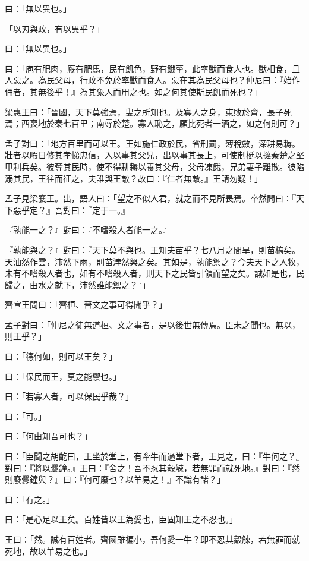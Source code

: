 \documentclass[12pt,a4paper]{ctexbook}
\begin{document}
曰：「無以異也。」\par
「以刃與政，有以異乎？」\par
曰：「無以異也。」\par
曰：「庖有肥肉，廐有肥馬，民有飢色，野有餓莩，此率獸而食人也。獸相食，且人惡之。為民父母，行政不免於率獸而食人。惡在其為民父母也？仲尼曰：『始作俑者，其無後乎！』為其象人而用之也。如之何其使斯民飢而死也？」\par
梁惠王曰：「晉國，天下莫強焉，叟之所知也。及寡人之身，東敗於齊，長子死焉；西喪地於秦七百里；南辱於楚。寡人恥之，願比死者一洒之，如之何則可？」\par
孟子對曰：「地方百里而可以王。王如施仁政於民，省刑罰，薄稅斂，深耕易耨。壯者以暇日修其孝悌忠信，入以事其父兄，出以事其長上，可使制梃以撻秦楚之堅甲利兵矣。彼奪其民時，使不得耕耨以養其父母，父母凍餓，兄弟妻子離散。彼陷溺其民，王往而征之，夫誰與王敵？故曰：『仁者無敵。』王請勿疑！」\par
孟子見梁襄王。出，語人曰：「望之不似人君，就之而不見所畏焉。卒然問曰：『天下惡乎定？』吾對曰：『定于一。』\par
『孰能一之？』對曰：『不嗜殺人者能一之。』\par
『孰能與之？』對曰：『天下莫不與也。王知夫苗乎？七八月之間旱，則苗槁矣。天油然作雲，沛然下雨，則苗浡然興之矣。其如是，孰能禦之？今夫天下之人牧，未有不嗜殺人者也，如有不嗜殺人者，則天下之民皆引領而望之矣。誠如是也，民歸之，由水之就下，沛然誰能禦之？』」\par
齊宣王問曰：「齊桓、晉文之事可得聞乎？」\par
孟子對曰：「仲尼之徒無道桓、文之事者，是以後世無傳焉。臣未之聞也。無以，則王乎？」\par
曰：「德何如，則可以王矣？」\par
曰：「保民而王，莫之能禦也。」\par
曰：「若寡人者，可以保民乎哉？」\par
曰：「可。」\par
曰：「何由知吾可也？」\par
曰：「臣聞之胡齕曰，王坐於堂上，有牽牛而過堂下者，王見之，曰：『牛何之？』對曰：『將以釁鐘。』王曰：『舍之！吾不忍其觳觫，若無罪而就死地。』對曰：『然則廢釁鐘與？』曰：『何可廢也？以羊易之！』不識有諸？」\par
曰：「有之。」\par
曰：「是心足以王矣。百姓皆以王為愛也，臣固知王之不忍也。」\par
王曰：「然。誠有百姓者。齊國雖褊小，吾何愛一牛？即不忍其觳觫，若無罪而就死地，故以羊易之也。」\par
\end{document}
